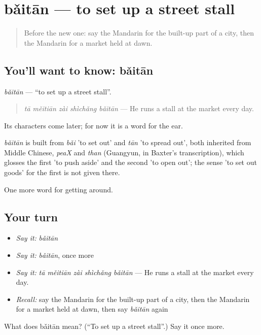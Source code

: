 \section[bǎitān]{bǎitān — to set up a street stall}

\label{lesson:ZH-C448-baitan}



\begin{quote}
Before the new one: say the Mandarin for the built-up part of a city, then the Mandarin for a market held at dawn.
\end{quote}

\subsection*{You'll want to know: bǎitān}
\emph{bǎitān} — \textquotedblleft{}to set up a street stall\textquotedblright{}.

\begin{quote}
\emph{tā měitiān zài shìchǎng bǎitān} — He runs a stall at the market every day.
\end{quote}

Its characters come later; for now it is a word for the ear.

\begin{cousinweb}
\emph{bǎitān} is built from \emph{bǎi} 'to set out' and \emph{tān} 'to spread out', both inherited from Middle Chinese, \emph{peaX} and \emph{than} (Guangyun, in Baxter's transcription), which glosses the first 'to push aside' and the second 'to open out'; the sense 'to set out goods' for the first is not given there.
\end{cousinweb}

\begin{grammarlens}[title={What you've built}]
One more word for getting around.
\end{grammarlens}

\subsection*{Your turn}
\begin{itemize}
\raggedright
  \item \emph{Say it:} \emph{bǎitān}
  \item \emph{Say it:} \emph{bǎitān}, once more
  \item \emph{Say it:} \emph{tā měitiān zài shìchǎng bǎitān} — He runs a stall at the market every day.
  \item \emph{Recall:} say the Mandarin for the built-up part of a city, then the Mandarin for a market held at dawn, then say \emph{bǎitān} again
\end{itemize}

\begin{tcolorbox}[breakable,colback=teal!4,colframe=teal!35!black,title={Before you move on}]
What does bǎitān mean? (\textquotedblleft{}To set up a street stall\textquotedblright{}.) Say it once more.
\end{tcolorbox}
